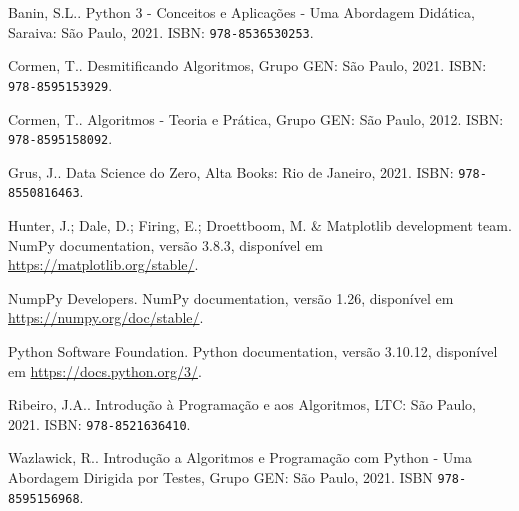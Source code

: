 \begin{thebibliography}{99}
    Banin, S.L.. Python 3 - Conceitos e Aplicações - Uma Abordagem Didática, Saraiva: São Paulo, 2021. ISBN: \texttt{978-8536530253}.
  
    Cormen, T.. Desmitificando Algoritmos, Grupo GEN: São Paulo, 2021. ISBN: \texttt{978-8595153929}.
  
    Cormen, T.. Algoritmos - Teoria e Prática, Grupo GEN: São Paulo, 2012. ISBN: \texttt{978-8595158092}.
  
    Grus, J.. Data Science do Zero, Alta Books: Rio de Janeiro, 2021. ISBN: \texttt{978-8550816463}.
  
    Hunter, J.; Dale, D.; Firing, E.; Droettboom, M. \& Matplotlib development team. NumPy documentation, versão 3.8.3, disponível em \url{https://matplotlib.org/stable/}.
  
    NumpPy Developers. NumPy documentation, versão 1.26, disponível em \url{https://numpy.org/doc/stable/}.
  
    Python Software Foundation. Python documentation, versão 3.10.12, disponível em \url{https://docs.python.org/3/}.
  
    Ribeiro, J.A.. Introdução à Programação e aos Algoritmos, LTC: São Paulo, 2021. ISBN: \texttt{978-8521636410}.
  
    Wazlawick, R.. Introdução a Algoritmos e Programação com Python - Uma Abordagem Dirigida por Testes, Grupo GEN: São Paulo, 2021. ISBN \texttt{978-8595156968}.
  
  \end{thebibliography}
  